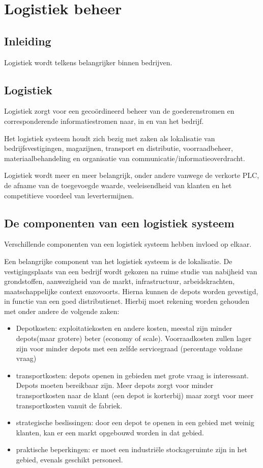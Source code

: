 \documentclass[../../samenvatting.tex]{subfiles}
\begin{document}
\section{Logistiek beheer}
\subsection{Inleiding}
Logistiek wordt telkens belangrijker binnen bedrijven.

\subsection{Logistiek}
Logistiek zorgt voor een gecoördineerd beheer van de goederenstromen en corresponderende informatiestromen naar, in en van het bedrijf. 

Het logistiek systeem houdt zich bezig met zaken als lokalisatie van bedrijfsvestigingen, magazijnen, transport en distributie, voorraadbeheer, materiaalbehandeling en organisatie van communicatie/informatieoverdracht.

Logistiek wordt meer en meer belangrijk, onder andere vanwege de verkorte PLC, de afname van de toegevoegde waarde, veeleisendheid van klanten en het competitieve voordeel van levertermijnen.

\subsection{De componenten van een logistiek systeem}
Verschillende componenten van een logistiek systeem hebben invloed op elkaar.

Een belangrijke component van het logistiek systeem is de lokalisatie. De vestigingsplaats van een bedrijf wordt gekozen na ruime studie van nabijheid van grondstoffen, aanwezigheid van de markt, infrastructuur, arbeidskrachten, maatschappelijke context enzovoorts. Hierna kunnen de depots worden gevestigd, in functie van een goed distributienet. Hierbij moet rekening worden gehouden met onder andere de volgende zaken:
\begin{itemize}
     \item Depotkosten: exploitatiekosten en andere kosten, meestal zijn minder depots(maar grotere) beter (economy of scale). Voorraadkosten zullen lager zijn voor minder depots met een zelfde servicegraad (percentage voldane vraag)
     \item transportkosten: depots openen in gebieden met grote vraag is interessant. Depots moeten bereikbaar zijn. Meer depots zorgt voor minder transportkosten naar de klant (een depot is korterbij) maar zorgt voor meer transportkosten vanuit de fabriek.
     \item strategische beslissingen: door een depot te openen in een gebied met weinig klanten, kan er een markt opgebouwd worden in dat gebied.
     \item praktische beperkingen: er moet een industriële stockageruimte zijn in het gebied, evenals geschikt personeel.
 \end{itemize}
\end{document}
